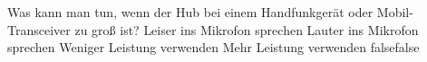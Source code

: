     {Was kann man tun, wenn der Hub bei einem Handfunkgerät oder Mobil-Transceiver zu groß ist?}
    {Leiser ins Mikrofon sprechen}
    {Lauter ins Mikrofon sprechen}
    {Weniger Leistung verwenden}
    {Mehr Leistung verwenden}
    {false}{false}